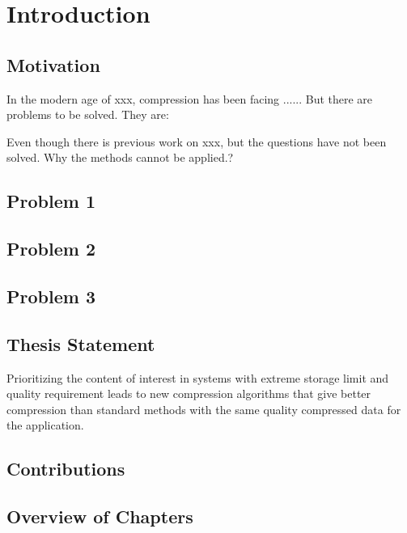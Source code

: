 \chapter{Introduction}

\section{Motivation}
In the modern age of xxx, compression has been facing ...... But there are problems to be solved. They are:

Even though there is previous work on xxx, but the questions have not been solved. Why the methods cannot be applied.?

\section{Problem 1}

\section{Problem 2}

\section{Problem 3}

\section{Thesis Statement}
Prioritizing the content of interest in systems with extreme storage limit and quality requirement leads to new compression algorithms that give better compression than standard methods with the same quality compressed data for the application.

\section{Contributions}
\section{Overview of Chapters}

